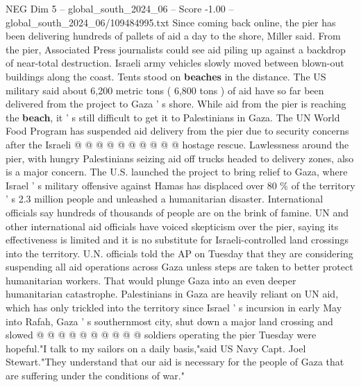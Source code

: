 \begin{textsample}{NEG Dim 5 – global\_south\_2024\_06 – Score -1.00 – global\_south\_2024\_06/109484995.txt}
Since coming back online, the pier has been delivering hundreds of pallets of aid a day to the shore, Miller said.
From the pier, Associated Press journalists could see aid piling up against a backdrop of near-total destruction.
Israeli army vehicles slowly moved between blown-out buildings along the coast.
Tents stood on \textbf{beaches} in the distance.
The US military said about 6,200 metric tons ( 6,800 tons ) of aid have so far been delivered from the project to Gaza ' s shore.
While aid from the pier is reaching the \textbf{beach}, it ' s still difficult to get it to Palestinians in Gaza.
The UN World Food Program has suspended aid delivery from the pier due to security concerns after the Israeli @ @ @ @ @ @ @ @ @ @ hostage rescue.
Lawlessness around the pier, with hungry Palestinians seizing aid off trucks headed to delivery zones, also is a major concern.
The U.S. launched the project to bring relief to Gaza, where Israel ' s military offensive against Hamas has displaced over 80 \% of the territory ' s 2.3 million people and unleashed a humanitarian disaster.
International officials say hundreds of thousands of people are on the brink of famine.
UN and other international aid officials have voiced skepticism over the pier, saying its effectiveness is limited and it is no substitute for Israeli-controlled land crossings into the territory.
U.N. officials told the AP on Tuesday that they are considering suspending all aid operations across Gaza unless steps are taken to better protect humanitarian workers.
That would plunge Gaza into an even deeper humanitarian catastrophe.
Palestinians in Gaza are heavily reliant on UN aid, which has only trickled into the territory since Israel ' s incursion in early May into Rafah, Gaza ' s southernmost city, shut down a major land crossing and slowed @ @ @ @ @ @ @ @ @ @ soldiers operating the pier Tuesday were hopeful."I talk to my sailors on a daily basis,"said US Navy Capt.
Joel Stewart."They understand that our aid is necessary for the people of Gaza that are suffering under the conditions of war."

\end{textsample}
